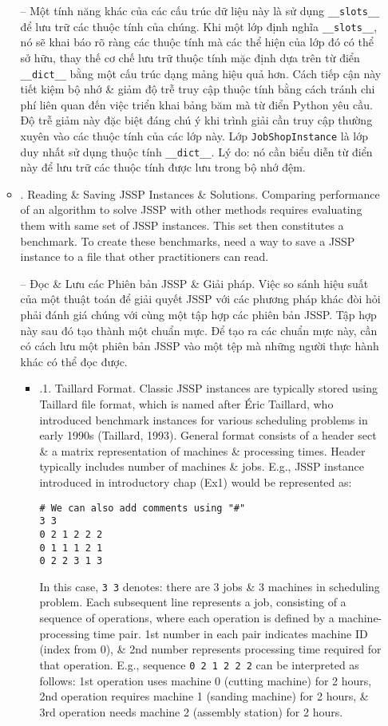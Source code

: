 \documentclass{article}
\begin{document}
\begin{itemize}
\begin{itemize}
        -- Một tính năng khác của các cấu trúc dữ liệu này là sử dụng \verb|__slots__| để lưu trữ các thuộc tính của chúng. Khi một lớp định nghĩa \verb|__slots__|, nó sẽ khai báo rõ ràng các thuộc tính mà các thể hiện của lớp đó có thể sở hữu, thay thế cơ chế lưu trữ thuộc tính mặc định dựa trên từ điển \verb|__dict__| bằng một cấu trúc dạng mảng hiệu quả hơn. Cách tiếp cận này tiết kiệm bộ nhớ \& giảm độ trễ truy cập thuộc tính bằng cách tránh chi phí liên quan đến việc triển khai bảng băm mà từ điển Python yêu cầu. Độ trễ giảm này đặc biệt đáng chú ý khi trình giải cần truy cập thường xuyên vào các thuộc tính của các lớp này. Lớp {\tt JobShopInstance} là lớp duy nhất sử dụng thuộc tính \verb|__dict__|. Lý do: nó cần biểu diễn từ điển này để lưu trữ các thuộc tính được lưu trong bộ nhớ đệm.
        \item {. Reading \& Saving JSSP Instances \& Solutions.} Comparing performance of an algorithm to solve JSSP with other methods requires evaluating them with same set of JSSP instances. This set then constitutes a benchmark. To create these benchmarks, need a way to save a JSSP instance to a file that other practitioners can read.

        -- {\sf Đọc \& Lưu các Phiên bản JSSP \& Giải pháp.} Việc so sánh hiệu suất của một thuật toán để giải quyết JSSP với các phương pháp khác đòi hỏi phải đánh giá chúng với cùng một tập hợp các phiên bản JSSP. Tập hợp này sau đó tạo thành một chuẩn mực. Để tạo ra các chuẩn mực này, cần có cách lưu một phiên bản JSSP vào một tệp mà những người thực hành khác có thể đọc được.
        \begin{itemize}
            \item {.1. Taillard Format.} Classic JSSP instances are typically stored using Taillard file format, which is named after {\sc\'Eric Taillard}, who introduced benchmark instances for various scheduling problems in early 1990s (Taillard, 1993). General format consists of a header sect \& a matrix representation of machines \& processing times. Header typically includes number of machines \& jobs. E.g., JSSP instance introduced in introductory chap (Ex1) would be represented as:
            \begin{verbatim}
# We can also add comments using "#"
3 3
0 2 1 2 2 2
0 1 1 1 2 1
0 2 2 3 1 3
            \end{verbatim}
            In this case, {\tt3 3} denotes: there are 3 jobs \& 3 machines in scheduling problem. Each subsequent line represents a job, consisting of a sequence of operations, where each operation is defined by a machine-processing time pair. 1st number in each pair indicates machine ID (index from 0), \& 2nd number represents processing time required for that operation. E.g., sequence {\tt0 2 1 2 2 2} can be interpreted as follows: 1st operation uses machine 0 (cutting machine) for 2 hours, 2nd operation requires machine 1 (sanding machine) for 2 hours, \& 3rd operation needs machine 2 (assembly station) for 2 hours.


\end{itemize}
\end{itemize}
\end{itemize}
\end{document}
